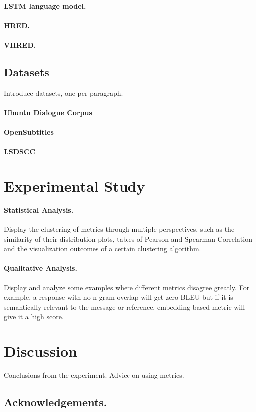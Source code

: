 \documentclass[runningheads]{llncs}
\begin{document}
    \paragraph{LSTM language model.}
    \paragraph{HRED.}
    \paragraph{VHRED.}

    \subsection{Datasets}
    Introduce datasets, one per paragraph.
    \paragraph{Ubuntu Dialogue Corpus}
    \paragraph{OpenSubtitles}
    \paragraph{LSDSCC}


    \section{Experimental Study}
    \paragraph{Statistical Analysis.}
    Display the clustering of metrics through multiple perspectives,
    such as the similarity of their distribution plots, tables of Pearson and Spearman Correlation
    and the visualization outcomes of a certain clustering algorithm.

    \paragraph{Qualitative Analysis.}
    Display and analyze some examples where different metrics disagree greatly.
    For example, a response with no n-gram overlap will get zero BLEU but if it is semantically
    relevant to the message or reference, embedding-based metric will give it a high score.

    \section{Discussion}
    Conclusions from the experiment.
    Advice on using metrics.

    \subsection*{Acknowledgements.}

    
    
\end{document}
